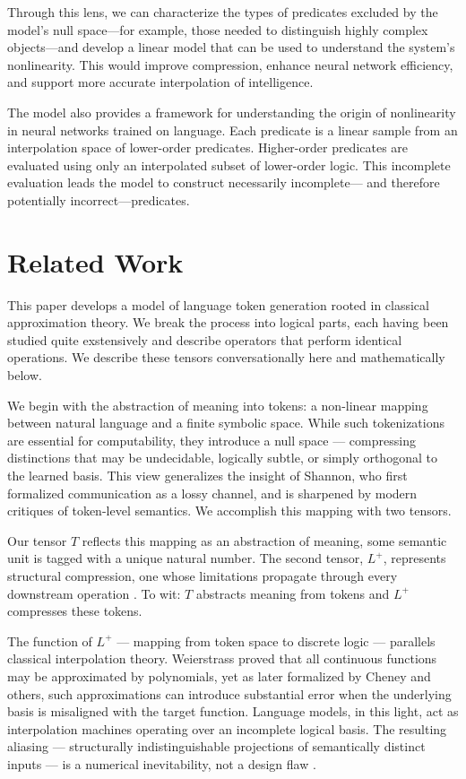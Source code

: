 \documentclass[12pt]{article}
\theoremstyle{plain}
\begin{document}
Through this lens, we can characterize the types of predicates
excluded by the model’s null space---for example, those needed 
to distinguish highly complex objects---and develop a linear model
that can be used to understand the system’s nonlinearity. This would 
improve compression, enhance neural network efficiency, and support 
more accurate interpolation of intelligence.

The model also provides a framework for understanding
the origin of nonlinearity in neural networks trained on language.
Each predicate is a linear sample from an interpolation space of lower-order predicates.
Higher-order predicates are evaluated using only an interpolated subset of lower-order logic.
This incomplete evaluation leads the model to construct necessarily incomplete---
and therefore potentially incorrect---predicates.

\section{Related Work}
This paper develops a model of language token generation rooted in classical
approximation theory.  We break the process into logical parts, each having
been studied quite exstensively and describe operators that perform identical
operations. We describe these tensors conversationally here and mathematically
below.

We begin with the abstraction of meaning into tokens: a non-linear mapping 
between natural language and a finite symbolic space. While such tokenizations 
are essential for computability, they introduce a null space — compressing 
distinctions that may be undecidable, logically subtle, or simply orthogonal 
to the learned basis. This view generalizes the insight of Shannon, who first 
formalized communication as a lossy channel, and is sharpened by modern 
critiques of token-level semantics. We accomplish this mapping with two tensors.

Our tensor $T$ reflects this mapping as an abstraction of meaning, some
semantic unit is tagged with a unique natural number. The second tensor,
$L^+$, represents structural compression, one whose limitations propagate through 
every downstream operation \cite{shannon1948, bender2020climbing}. 
To wit: $T$ abstracts meaning from tokens and $L^+$ compresses these
tokens.

The function of $L^+$ — mapping from token space to discrete logic — parallels 
classical interpolation theory. Weierstrass proved that all continuous functions 
may be approximated by polynomials, yet as later formalized by Cheney and others, 
such approximations can introduce substantial error when the underlying basis is 
misaligned with the target function. Language models, in this light, act as 
interpolation machines operating over an incomplete logical basis. The resulting 
aliasing — structurally indistinguishable projections of semantically distinct 
inputs — is a numerical inevitability, not a design flaw \cite{cheney1966approx, 
courant1924methoden}.
\end{document}
